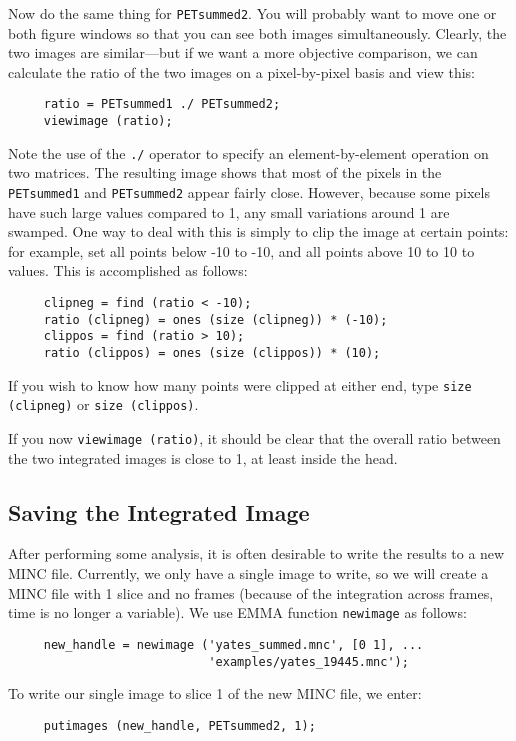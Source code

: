 Now do the same thing for \verb|PETsummed2|.  You will probably want
to move one or both figure windows so that you can see both images
simultaneously.  Clearly, the two images are similar---but if we want
a more objective comparison, we can calculate the ratio of the two
images on a pixel-by-pixel basis and view this:
\begin{verbatim}
     ratio = PETsummed1 ./ PETsummed2;
     viewimage (ratio);
\end{verbatim}
Note the use of the \verb|./| operator to specify an
element-by-element operation on two matrices.  The resulting image
shows that most of the pixels in the \verb|PETsummed1| and
\verb|PETsummed2| appear fairly close.  However, because some pixels have
such large values compared to 1, any small variations around 1 are
swamped.  One way to deal with this is simply to clip the image at
certain points: for example, set all points below -10 to -10, and all
points above 10 to 10 to values.  This is accomplished as follows:
\begin{verbatim}
     clipneg = find (ratio < -10);
     ratio (clipneg) = ones (size (clipneg)) * (-10);
     clippos = find (ratio > 10);
     ratio (clippos) = ones (size (clippos)) * (10);
\end{verbatim}
If you wish to know how many points were clipped at either end,
type \verb|size (clipneg)| or \verb|size (clippos)|.

If you now \verb|viewimage (ratio)|, it should be clear that the
overall ratio between the two integrated images is close to 1, at
least inside the head.

\subsection{Saving the Integrated Image}

After performing some analysis, it is often desirable to write the
results to a new MINC file.  Currently, we only have a single image to
write, so we will create a MINC file with 1 slice and no frames
(because of the integration across frames, time is no longer a
variable).  We use EMMA function \verb|newimage| as follows:
\begin{verbatim}
     new_handle = newimage ('yates_summed.mnc', [0 1], ...
                            'examples/yates_19445.mnc');
\end{verbatim}
To write our single image to slice 1 of the new MINC file, we enter:
\begin{verbatim}
     putimages (new_handle, PETsummed2, 1);
\end{verbatim}

